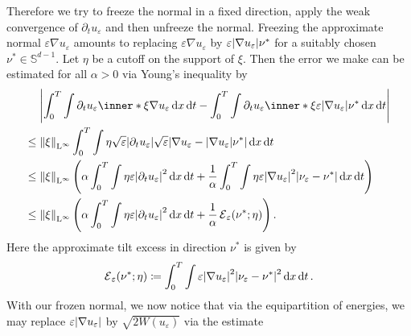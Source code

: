 Therefore we try to freeze the normal in a fixed direction, apply the weak convergence of $ \partial_{ t } u_{ \varepsilon } $ and then unfreeze the normal. Freezing the approximate normal $ \varepsilon \nabla u_{ \varepsilon } $ amounts to replacing $ \varepsilon \nabla u_{ \varepsilon } $ by $ \varepsilon \abs{ \nabla u_{ \varepsilon } } \nu^{ \ast } $ for a suitably chosen $ \nu^{ \ast } \in \mathbb{ S }^{ d-1 } $. Let $ \eta $ be a cutoff on the support of $ \xi $. Then the error we make can be estimated for all $ \alpha > 0 $ via Young's inequality by
\begin{align*}
	&\abs{
		\int_{ 0 }^{ T }
		\int
		\partial_{ t } u_{ \varepsilon }
		\inner*{ \xi }{ \nabla u_{ \varepsilon } }
		\dd{ x }
		\dd{ t }
		-
		\int_{ 0 }^{ T }
		\int
		\partial_{ t } u_{ \varepsilon }
		\inner*{ \xi }{ \varepsilon \abs{ \nabla u_{ \varepsilon } } \nu^{ \ast } }
		\dd{ x }
		\dd{ t }
	}
	\\
	\leq {} &
	\norm{ \xi }_{ \lp^{ \infty } }
	\int_{ 0 }^{ T }
	\int
	\eta
	\sqrt{ \varepsilon }
	\abs{ \partial_{  t } u_{ \varepsilon } }
	\sqrt{  \varepsilon } 
	\abs{
		\nabla u_{ \varepsilon }
		-
		\abs{ \nabla u_{ \varepsilon } }
		\nu^{ \ast }
	}
	\dd{ x } 
	\dd{ t }
	\\
	\leq {} &
	\norm{ \xi }_{ \lp^{ \infty } }
	\left(
	\alpha 
	\int_{ 0 }^{ T }
	\int
	\eta
	\varepsilon \abs{ \partial_{ t } u_{ \varepsilon } }^{ 2 }
	\dd{ x }
	\dd{ t }
	+
	\frac{ 1 }{ \alpha }
	\int_{ 0 }^{ T }
	\int
	\eta
	\varepsilon
	\abs{ \nabla u_{ \varepsilon } }^{ 2 }
	\abs{
		\nu_{ \varepsilon } - \nu^{ \ast } 
	} 
	\dd{ x }
	\dd{ t }
	\right)
	\\
	\leq{}
	&
	\norm{ \xi }_{ \lp^{ \infty } }
	\left( 
	\alpha 	
	\int_{ 0 }^{ T }
	\int
	\eta
	\varepsilon \abs{ \partial_{ t } u_{ \varepsilon } }^{ 2 }
	\dd{ x }
	\dd{ t }
	+ 
	\frac{ 1 }{ \alpha }
	\tilt_excess_{ \varepsilon } ( \nu^{ \ast } ; \eta ) 
	\right).
\end{align*}
Here the approximate tilt excess in direction $ \nu^{ \ast } $ is given by
\begin{equation*}
	\tilt_excess_{ \varepsilon } ( \nu^{ \ast } ; \eta )
	\coloneqq
	\int_{ 0 }^{ T }
	\int
	\varepsilon 
	\abs{ \nabla u_{ \varepsilon } }^{ 2 }
	\abs{ \nu_{ \varepsilon } - \nu^{ \ast } }^{ 2 }
	\dd{ x }
	\dd{ t }.
\end{equation*}
With our frozen normal, we now notice that via the equipartition of energies, we may replace $ \varepsilon \abs{ \nabla u_{ \varepsilon } } $ by $ \sqrt{ 2 W ( u_{ \varepsilon } ) } $ via the estimate
